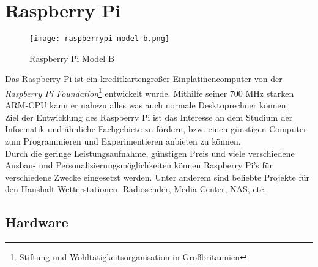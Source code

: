 \chapter{Raspberry Pi}


\begin{figure}[h]
  \begin{center}		%
    \texttt{[image: raspberrypi-model-b.png]}
  		  \caption{Raspberry Pi Model B}
     \label{raspPic}
  \end{center}
\end{figure}			
				
Das Raspberry Pi ist ein kreditkartengroßer Einplatinencomputer von der \textit{Raspberry Pi Foundation}\footnote{Stiftung und Wohltätigkeitsorganisation in Großbritannien} entwickelt wurde. Mithilfe seiner 700 MHz starken ARM-CPU kann er nahezu alles was auch normale Desktoprechner können.\\

Ziel der Entwicklung des Raspberry Pi ist das Interesse an dem Studium der Informatik und ähnliche Fachgebiete zu fördern, bzw. einen günstigen Computer zum Programmieren und Experimentieren anbieten zu können.\\

Durch die geringe Leistungsaufnahme, günstigen Preis und viele verschiedene Ausbau- und Personalisierungsmöglichkeiten können Raspberry Pi’s für verschiedene Zwecke eingesetzt werden. Unter anderem sind beliebte Projekte für den Haushalt Wetterstationen, Radiosender, Media Center, NAS, etc.

\newpage

\section{Hardware}
